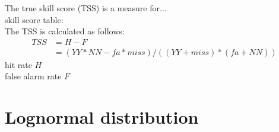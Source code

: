 The true skill score (TSS) is a measure for...\\

skill score table:\\


The TSS is calculated as follows:
\begin{align}
	TSS &= H - F\\
		&= (YY*NN - fa*miss)/((YY+miss)*(fa+NN))	\label{eq:true_skill_score}
\end{align}
hit rate $H$\\
false alarm rate $F$\\



% 
% 
% 
% 



\section{Lognormal distribution}
\label{sec:lognormal_distribution}

